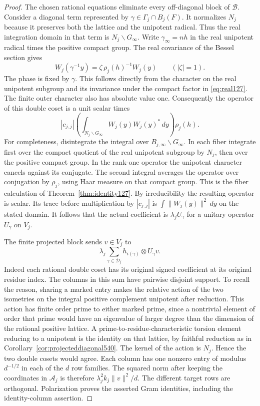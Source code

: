 \documentclass[a4paper,11pt]{article}
\theoremstyle{definition}
\theoremstyle{remark}
\numberwithin{equation}{section}
\begin{document}
\begin{proof}
The chosen rational equations eliminate every off-diagonal
block of \(\mathcal B\). Consider a diagonal term represented
by \(\gamma\in\Gamma_j\cap B_j(F)\). It normalizes \(N_j\)
because it preserves both the lattice and the unipotent radical.
Thus the real integration domain in that term is
\(N_j\backslash G_\infty\). Write \(\gamma_\infty=nh\) in
the real unipotent radical times the positive compact group.
The real covariance of the Bessel section gives
\[
            W_j(\gamma^{-1}y)
                  =\zeta\,\rho_j(h)^{-1}W_j(y)
                 \qquad(|\zeta|=1).
\]
The phase is fixed by \(\gamma\). This follows directly from
the character on the real unipotent subgroup and its invariance
under the compact factor in \eqref{eq:real127}. The finite
outer character also has absolute value one. Consequently
the operator of this double coset is a unit scalar times
\[
          |c_{j,j}|
          \left(\int_{N_j\backslash G_\infty}
                    W_j(y)W_j(y)^*\,dy\right)\rho_j(h).
\]
For completeness, disintegrate the integral over
\(B_{j,\infty}\backslash G_\infty\). In each fiber integrate
first over the compact quotient of the real unipotent subgroup
by \(N_j\), then over the positive compact group. In the
rank-one operator the unipotent character cancels against
its conjugate. The second integral averages the operator
over conjugation by \(\rho_j\), using Haar measure on that
compact group. This is the fiber calculation of
Theorem~\ref{thm:identity127}. By irreducibility the resulting
operator is scalar. Its trace before multiplication by
\(|c_{j,j}|\) is \(\int\|W_j(y)\|^2\,dy\) on the stated
domain. It follows that the actual coefficient is
\(\lambda_j U_\gamma\) for a unitary operator \(U_\gamma\)
on \(V_j\).

The finite projected block sends \(v\in V_j\) to
\[
       \lambda_j\sum_{\gamma\in\mathcal D_j}
                  h_{i(\gamma)}\otimes U_\gamma v .
\]
Indeed each rational double coset has its original signed
coefficient at its original residue index. The columns in
this sum have pairwise disjoint support. To recall the
reason, sharing a marked entry makes the relative action
of the two isometries on the integral positive complement
unipotent after reduction. This action has finite order
prime to either marked prime, since a nontrivial element of
order that prime would have an eigenvalue of larger degree
than the dimension of the rational positive lattice. A
prime-to-residue-characteristic torsion element reducing to
a unipotent is the identity on that lattice, by faithful
reduction as in Corollary~\ref{cor:projecteddiagonal540}.
The kernel of the action is \(N_j\). Hence the two double
cosets would agree. Each column has one nonzero entry of
modulus \(d^{-1/2}\) in each of the \(d\) row families.
The squared norm after keeping the coordinates in
\(\mathcal A_j\) is therefore
\(\lambda_j^2 k_j\|v\|^2/d\). The different target rows
are orthogonal. Polarization proves the asserted Gram
identities, including the identity-column assertion.
\end{proof}
\end{document}
